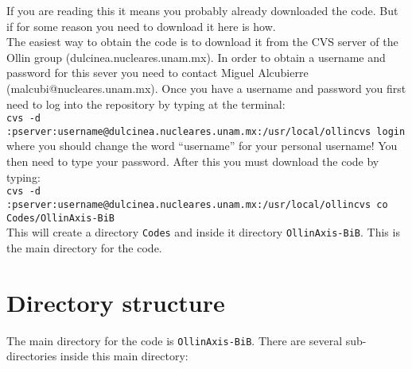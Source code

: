 \documentclass[12pt]{article}
\begin{document}
If you are reading this it means you probably already downloaded the
code.  But if for some reason you need to download it here is how. \\

The easiest way to obtain the code is to download it from the CVS
server of the Ollin group (dulcinea.nucleares.unam.mx).  In order to
obtain a username and password for this sever you need to contact
Miguel Alcubierre (malcubi@nucleares.unam.mx). Once you have a
username and password you first need to log into the repository by
typing at the terminal: \\

\texttt{\footnotesize cvs -d
  :pserver:username@dulcinea.nucleares.unam.mx:/usr/local/ollincvs
  login} \\

where you should change the word ``username'' for your personal
username! You then need to type your password.  After this you must
download the code by typing: \\

\texttt{\footnotesize cvs -d
  :pserver:username@dulcinea.nucleares.unam.mx:/usr/local/ollincvs co
  Codes/OllinAxis-BiB} \\

This will create a directory \texttt{Codes} and inside it directory
\texttt{OllinAxis-BiB}. This is the main directory for the code.

\pagebreak



\section{Directory structure}

The main directory for the code is \texttt{OllinAxis-BiB}.  There are
several sub-directories inside this main directory:
\end{document}
